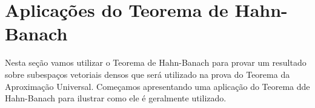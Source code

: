 
\section{Aplicações do Teorema de Hahn-Banach}

Nesta seção vamos utilizar o Teorema de Hahn-Banach para provar um resultado sobre subespaços vetoriais densos que será utilizado na prova do Teorema da Aproximação Universal.
Começamos apresentando uma aplicação do Teorema dde Hahn-Banach para ilustrar como ele é geralmente utilizado.